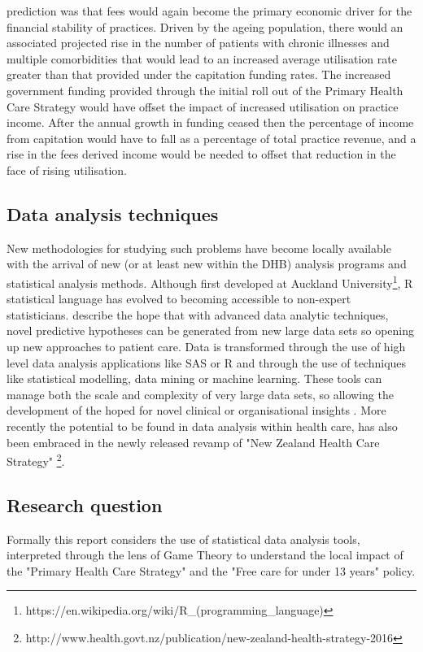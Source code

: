 \documentclass[11pt,a4paper]{article}
\begin{document}
\citet{howell2005restructuring} prediction was that fees would again become the primary economic driver for the financial stability of practices. Driven by the ageing  population, there would an associated projected rise in the number of patients with chronic illnesses and multiple comorbidities that would lead to an increased  average utilisation rate greater than that provided under the capitation funding rates. The increased government funding provided through the initial roll out of the Primary Health Care Strategy would have offset the impact of increased utilisation on practice income. After the annual growth in funding ceased then the percentage of income from capitation would have to fall as a percentage of total practice revenue, and a rise in the fees derived income would be needed to offset that reduction in the face of rising utilisation.\\

\subsection{Data analysis techniques}
New methodologies for studying such problems have become locally available with the arrival of new (or at least new within the DHB) analysis programs and statistical analysis methods. Although first developed at Auckland University\footnote{https://en.wikipedia.org/wiki/R\_(programming\_language)}, R statistical language has evolved to becoming accessible to non-expert statisticians. \citet{khoury2014big}  describe the hope that with advanced data analytic techniques,  novel predictive hypotheses can be generated from new large data sets so opening up new approaches to patient care. Data is transformed through the use of high level data analysis applications like SAS or R and through the use of techniques like statistical modelling, data mining or machine learning. These tools can manage both the scale and complexity of very large data sets, so allowing the development of the hoped for novel clinical or organisational insights \citep{reshef2011detecting}.  More recently the potential to be found in data analysis within health care, has also been embraced in the newly released revamp of "New Zealand Health Care Strategy" \footnote{http://www.health.govt.nz/publication/new-zealand-health-strategy-2016}. \\

\subsection{Research question}
Formally this report considers the use of statistical data analysis tools, interpreted through the lens of Game Theory to understand the local impact of the "Primary Health Care Strategy" and the "Free care for under 13 years" policy. \\ 
\end{document}
